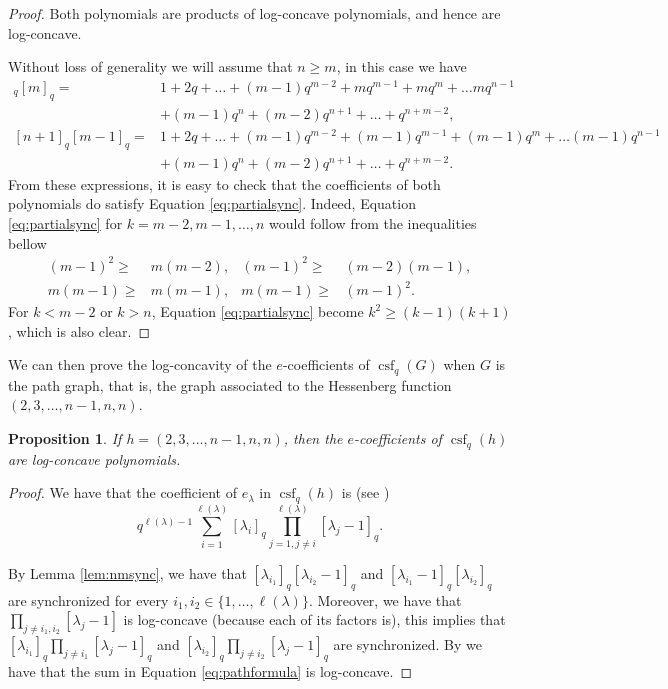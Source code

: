 \documentclass[10pt]{amsart}
\newtheorem{Prop}[Lem]{Proposition}
\theoremstyle{definition}
\DeclareMathOperator{\csf}{csf}
\begin{document}
\begin{proof}
Both polynomials are products of log-concave polynomials, and hence are log-concave.\par
  Without loss of generality we will assume that $n\geq m$, in this case we have
  \begin{align*}
      [n]_q[m]_q=&1+2q+\ldots+(m-1)q^{m-2} +mq^{m-1}+mq^{m}+\ldots mq^{n-1}\\
                 &+(m-1)q^{n}+(m-2)q^{n+1}+\ldots+ q^{n+m-2},\\
      [n+1]_q[m-1]_q=&1+2q+\ldots +(m-1)q^{m-2}+(m-1)q^{m-1}+(m-1)q^m+\ldots (m-1)q^{n-1}\\
                     &+(m-1)q^{n}+(m-2)q^{n+1}+\ldots+ q^{n+m-2}.
  \end{align*}
  From these expressions, it is easy to check that the coefficients of both polynomials do satisfy Equation \eqref{eq:partialsync}. Indeed,  Equation \eqref{eq:partialsync} for $k=m-2, m-1, \ldots, n $ would follow from the inequalities bellow
  \begin{align*}
      (m-1)^2\geq& m(m-2),& (m-1)^2\geq& (m-2)(m-1),\\
      m(m-1)\geq & m(m-1), &  m(m-1)\geq& (m-1)^2.
  \end{align*}
    For $k<m-2$ or $k>n$, Equation \eqref{eq:partialsync} become $k^2\geq (k-1)(k+1)$, which is also clear.      
\end{proof}
  We can then prove the log-concavity of the $e$-coefficients of $\csf_q(G)$ when $G$ is the path graph, that is, the graph associated to the Hessenberg function $(2,3,\ldots, n-1,n,n)$.
  
  \begin{Prop}
  \label{prop:path}
  If $h=(2,3,\ldots, n-1,n,n)$, then the $e$-coefficients of $\csf_q(h)$ are log-concave polynomials.
  \end{Prop}
   \begin{proof}
   We have that the coefficient of $e_{\lambda}$ in $\csf_q(h)$ is (see \cite{Haiman})
   \begin{equation}
       \label{eq:pathformula}
       q^{\ell(\lambda)-1}\sum_{i=1}^{\ell(\lambda)} [\lambda_i]_q\prod_{j=1, j\neq i}^{\ell(\lambda)} [\lambda_j-1]_q.
   \end{equation}
   
  By Lemma \ref{lem:nmsync}, we have that $[\lambda_{i_1}]_q[\lambda_{i_2}-1]_q$ and $[\lambda_{i_1}-1]_q[\lambda_{i_2}]_q$ are synchronized for every $i_1,i_2\in \{1,\ldots, \ell(\lambda)\}$. Moreover, we have that $\prod_{j\neq i_1,i_2}[\lambda_j-1]$ is log-concave (because each of its factors is), this implies that $[\lambda_{i_1}]_q\prod_{j\neq i_1} [\lambda_j-1]_q$ and $[\lambda_{i_2}]_q\prod_{j\neq i_2} [\lambda_j-1]_q$ are  synchronized. By \cite[Theorem 2.13]{GMTW} we have that the sum in Equation \eqref{eq:pathformula} is log-concave.
  \end{proof}
  
\end{document}
